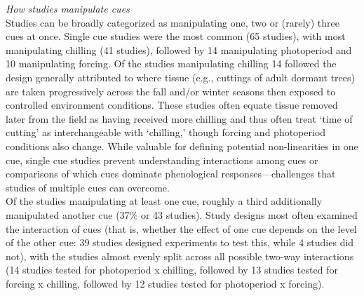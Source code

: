 \documentclass[11pt,letter]{article}
\begin{document}
\emph{How studies manipulate cues}\\
Studies can be broadly categorized as manipulating one, two or (rarely) three cues at once. Single cue studies were the most common (65 studies),  with most manipulating chilling  (41 studies), followed by 14 manipulating photoperiod and 10 manipulating forcing. Of the studies manipulating chilling 14 followed the design generally attributed to \citet{weinberger1950} where tissue (e.g., cuttings of adult dormant trees) are taken progressively across the fall and/or winter seasons then exposed to controlled environment conditions. These studies often equate tissue removed later from the field as having received more chilling and thus often treat `time of cutting' as interchangeable with `chilling,'  though forcing and photoperiod conditions also change. While valuable for defining potential non-linearities in one cue, single cue studies prevent understanding interactions among cues or comparisons of which cues dominate phenological responses---challenges that studies of multiple cues can overcome. \\

Of the studies manipulating at least one cue, roughly a third additionally manipulated another cue (37\% or 43 studies). Study designs most often examined the interaction of cues (that is, whether the effect of one cue depends on the level of the other cue: 39 studies designed experiments to test this, while 4 studies did not), with the studies almost evenly split across all possible two-way interactions (14 studies tested for photoperiod x chilling, followed by 13 studies tested for forcing x chilling, followed by 12 studies tested for photoperiod x forcing). \\
\end{document}
